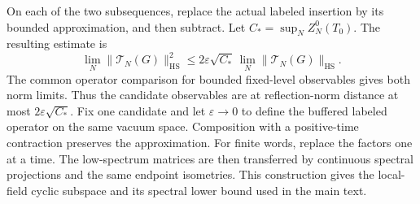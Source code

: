 \documentclass[11pt,a4paper]{article}
\numberwithin{equation}{section}
\newcommand{\HS}{\mathrm{HS}}
\begin{document}
On each of the two subsequences, replace the actual labeled insertion by its bounded approximation, and then subtract. Let \(C_*=\sup_N Z_N^0(T_0)\). The resulting estimate is
\[
 \lim_N\|\mathcal T_N(G)\|_{\HS}^2
       \leq 2\varepsilon\sqrt{C_*}\,\lim_N\|\mathcal T_N(G)\|_{\HS} .
\]
The common operator comparison for bounded fixed-level observables gives both norm limits. Thus the candidate observables are at reflection-norm distance at most \(2\varepsilon\sqrt{C_*}\). Fix one candidate and let \(\varepsilon\to0\) to define the buffered labeled operator on the same vacuum space. Composition with a positive-time contraction preserves the approximation. For finite words, replace the factors one at a time. The low-spectrum matrices are then transferred by continuous spectral projections and the same endpoint isometries. This construction gives the local-field cyclic subspace and its spectral lower bound used in the main text.
{}
\begingroup\small
\end{document}
